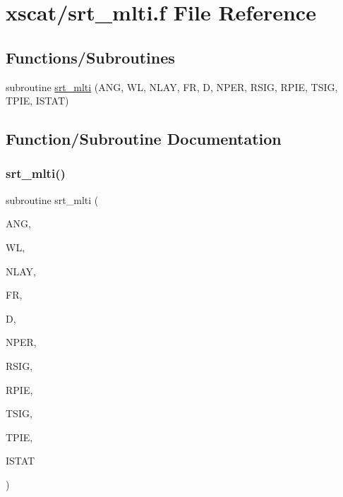 \hypertarget{xscat_2srt__mlti_8f}{}\section{xscat/srt\+\_\+mlti.f File Reference}
\label{xscat_2srt__mlti_8f}
\subsection*{Functions/\+Subroutines}
\begin{DoxyCompactItemize}
\item 
subroutine \hyperlink{xscat_2srt__mlti_8f_ab0026ff6deb9ef7e3b847b454a0d8e40}{srt\+\_\+mlti} (A\+NG, WL, N\+L\+AY, FR, D, N\+P\+ER, R\+S\+IG, R\+P\+IE, T\+S\+IG, T\+P\+IE, I\+S\+T\+AT)
\end{DoxyCompactItemize}


\subsection{Function/\+Subroutine Documentation}
\mbox{\label{xscat_2srt__mlti_8f_ab0026ff6deb9ef7e3b847b454a0d8e40}} 
\subsubsection{\texorpdfstring{srt\+\_\+mlti()}{srt\_mlti()}}
{\footnotesize\ttfamily subroutine srt\+\_\+mlti (\begin{DoxyParamCaption}\item[{double precision}]{A\+NG,  }\item[{double precision}]{WL,  }\item[{integer}]{N\+L\+AY,  }\item[{double complex, dimension(nlay)}]{FR,  }\item[{double precision, dimension(nlay)}]{D,  }\item[{integer}]{N\+P\+ER,  }\item[{double precision}]{R\+S\+IG,  }\item[{double precision}]{R\+P\+IE,  }\item[{double precision}]{T\+S\+IG,  }\item[{double precision}]{T\+P\+IE,  }\item[{integer}]{I\+S\+T\+AT }\end{DoxyParamCaption})}


